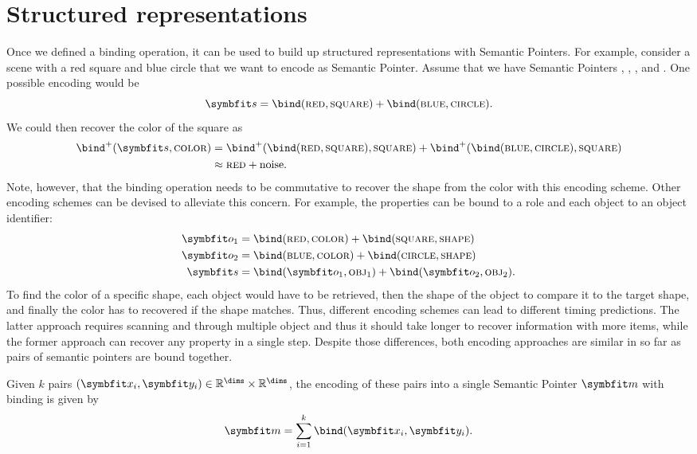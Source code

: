 \section{Structured representations}
Once we defined a binding operation, it can be used to build up structured representations with Semantic Pointers.
For example, consider a scene with a red square and blue circle that we want to encode as Semantic Pointer.
Assume that we have Semantic Pointers , , , and .
One possible encoding would be
\begin{equation}
    \vc s = \bind(\spc{red}, \spc{square}) + \bind(\spc{blue}, \spc{circle}) \text{.}
\end{equation}
We could then recover the color of the square as
\begin{align}
    \bind^+(\vc s, \spc{color}) &= \bind^+(\bind(\spc{red}, \spc{square}), \spc{square}) + \bind^+(\bind(\spc{blue}, \spc{circle}), \spc{square}) \\
    &\approx \spc{red} + \mathrm{noise} \text{.}
\end{align}
Note, however, that the binding operation needs to be commutative to recover the shape from the color with this encoding scheme.
Other encoding schemes can be devised to alleviate this concern.
For example, the properties can be bound to a role and each object to an object identifier:
\begin{align}
    \vc o_1 &= \bind(\spc{red}, \spc{color}) + \bind(\spc{square}, \spc{shape}) \\
    \vc o_2 &= \bind(\spc{blue}, \spc{color}) + \bind(\spc{circle}, \spc{shape}) \\
    \vc s &= \bind(\vc o_1, \spc{obj}_1) + \bind(\vc o_2, \spc{obj}_2) \text{.}
\end{align}
To find the color of a specific shape, each object would have to be retrieved, then the shape of the object to compare it to the target shape, and finally the color has to recovered if the shape matches.
Thus, different encoding schemes can lead to different timing predictions.
The latter approach requires scanning and through multiple object and thus it should take longer to recover information with more items, while the former approach can recover any property in a single step.
Despite those differences, both encoding approaches are similar in so far as pairs of semantic pointers are bound together.
\begin{defn}
    Given $k$ pairs $(\vc x_i, \vc y_i) \in \mathbb{R}^{\dims} \times \mathbb{R}^{\dims}$, the encoding of these pairs into a single Semantic Pointer $\vc m$ with binding is given by
    \begin{equation}
        \vc m = \sum_{i=1}^k \bind(\vc x_i, \vc y_i) \text{.}
    \end{equation}
\end{defn}
